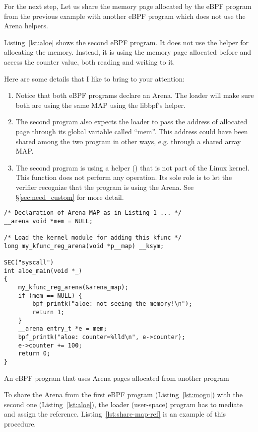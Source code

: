 \documentclass{article}
\begin{document}
For the next step, Let us share the memory page allocated by the eBPF program
from the previous example with another eBPF program which does not use the Arena
helpers.

Listing~\ref{lst:aloe} shows the second eBPF program. It does not use the
 helper for allocating the memory. Instead, it is
using the memory page allocated before and access the counter value, both
reading and writing to it.

Here are some details that I like to bring to your attention:
\begin{enumerate}
    \item Notice that both eBPF programs declare an Arena. The loader will
        make sure both are using the same MAP using the libbpf's
         helper.
    \item The second program also expects the loader to pass the address of
        allocated page through its global variable called ``mem''. This address
        could have been shared among the two program in other ways, e.g.
        through a shared array MAP\@.
    \item The second program is using a helper () that is
        not part of the Linux kernel. This function does not perform any
        operation. Its sole role is to let the verifier recognize that the
        program is using the Arena. See \S\ref{sec:need_custom} for more detail.
\end{enumerate}

\begin{listing}
\begin{verbatim}
/* Declaration of Arena MAP as in Listing 1 ... */
__arena void *mem = NULL;

/* Load the kernel module for adding this kfunc */
long my_kfunc_reg_arena(void *p__map) __ksym;

SEC("syscall")
int aloe_main(void *_)
{
    my_kfunc_reg_arena(&arena_map);
    if (mem == NULL) {
        bpf_printk("aloe: not seeing the memory!\n");
        return 1;
    }
    __arena entry_t *e = mem;
    bpf_printk("aloe: counter=%lld\n", e->counter);
    e->counter += 100;
    return 0;
}
\end{verbatim}
\caption{An eBPF program that uses Arena pages allocated from another program}
\label{lst:aloe}
\end{listing}

To share the Arena from the first eBPF program (Listing~\ref{lst:mogu})
with the second one (Listing~\ref{lst:aloe}), the loader (user-space) program
has to mediate and assign the reference. Listing~\ref{lst:share-map-ref} is an
example of this procedure.
\end{document}
